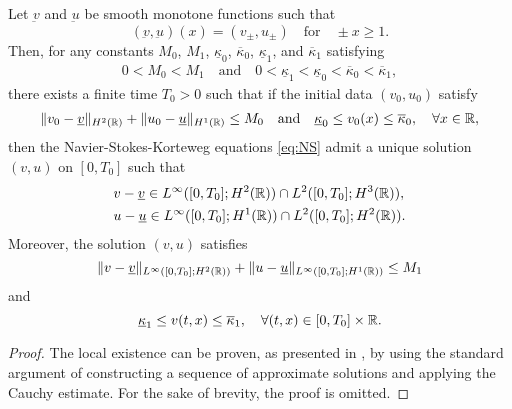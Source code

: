 \documentclass[11pt,reqno]{amsart}
\begin{document}
\begin{proposition}\label{prop:local}
	Let $\underbar{v}$ and $\underbar{u}$ be smooth monotone functions such that
	\[(\underbar{v},\underbar{u})(x) = (v_{\pm},u_{\pm} )\quad \mbox{for}\quad\pm x\ge 1.\]
	Then, for any constants $M_0$, $M_1$, $\underline{\kappa}_0$, $\overline{\kappa}_0$, $\underline{\kappa}_{1}$, and $\overline{\kappa}_1$ satisfying
    \begin{align*}
        0<M_0<M_1 \quad \text{and} \quad 0<\underline{\kappa}_1<\underline{\kappa}_0<\overline{\kappa}_0<\overline{\kappa}_1,
    \end{align*}
	there exists a finite time $T_0>0$ such that if the initial data $(v_0,u_0)$ satisfy
    \begin{align*}
    \|v_0-\underline{v}\|_{H^2(\mathbb{R})}+\|u_0-\underline{u}\|_{H^1(\mathbb{R})}\le M_0 
    \quad \text{and} \quad
    \underline{\kappa}_0\le v_0(x)\le\overline{\kappa}_0,\quad\forall x\in\mathbb{R},
    \end{align*}
	then the Navier-Stokes-Korteweg equations \eqref{eq:NS} admit a unique solution $(v,u)$ on $[0,T_0]$ such that 
	\begin{align*}
	&v-\underline{v}\in L^\infty ([0,T_0];H^2(\mathbb{R}))\cap L^2([0,T_0];H^3(\mathbb{R})),\\ 
    & u-\underline{u}\in L^\infty([0,T_0];H^1(\mathbb{R}))\cap L^2([0,T_0];H^2(\mathbb{R})).
	\end{align*}
    Moreover, the solution $(v,u)$ satisfies
	\[\|v-\underline{v}\|_{L^\infty([0,T_0];H^2(\mathbb{R}))}+\|u-\underline{u}\|_{L^\infty([0,T_0];H^1(\mathbb{R}))}\le M_1\]
	and 
	\[\underline{\kappa}_1\le v(t,x)\le \overline{\kappa}_1,\quad \forall(t,x)\in [0,T_0]\times \mathbb{R}.\]
\end{proposition}
	
	\begin{proof}
		The local existence can be proven, as presented in \cite{S76}, by using the standard argument of constructing a sequence of approximate solutions and applying the Cauchy estimate. For the sake of brevity, the proof is omitted.
	\end{proof}
\end{document}
